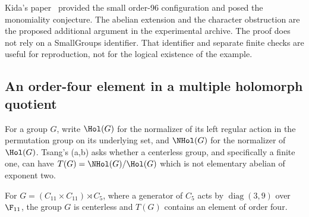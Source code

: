 Kida's paper~\cite{kida} provided the small order-96 configuration
and posed the monomiality conjecture. The abelian extension and
the character obstruction are the proposed additional argument
in the experimental archive. The proof does not rely on a
SmallGroups identifier. That identifier and separate finite
checks are useful for reproduction, not for the logical
existence of the example.


\subsection{An order-four element in a multiple holomorph quotient}
\label{subsec:holomorph}

For a group $G$, write $\Hol(G)$ for the normalizer of its
left regular action in the permutation group on its underlying
set, and $\NHol(G)$ for the normalizer of $\Hol(G)$.
Tsang's (a,b) asks whether a centerless group,
and specifically a finite one, can have
$T(G)=\NHol(G)/\Hol(G)$ which is not elementary abelian of
exponent two.

\begin{theorem}
\label{thm:holomorph}
For $G=(C_{11}\times C_{11})\rtimes C_5$, where a generator
of $C_5$ acts by $\operatorname{diag}(3,9)$ over $\F_{11}$,
the group $G$ is centerless and $T(G)$ contains an element
of order four.
\end{theorem}


